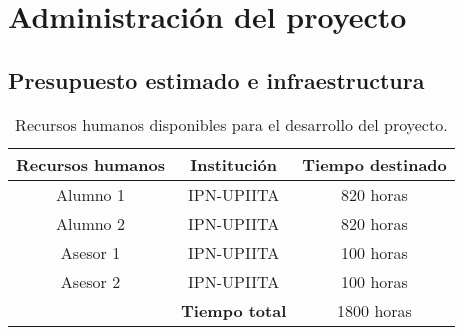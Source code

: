 \newpage
\section{Administración del proyecto}
\label{Presupuesto destinado}

\subsection{Presupuesto estimado e infraestructura}

\begin{table}[!ht]
	\centering
	\caption{Recursos humanos disponibles para el desarrollo del proyecto.}
	\begin{tabular}{ccc}
		\toprule
		\textbf{Recursos humanos} & \textbf{Institución}  & \textbf{Tiempo destinado} \\ \midrule
		        Alumno 1          &      IPN-UPIITA       &         820 horas         \\
		        Alumno 2          &      IPN-UPIITA       &         820 horas         \\ \midrule
		        Asesor 1          &      IPN-UPIITA       &         100 horas         \\
		        Asesor 2          &      IPN-UPIITA       &         100 horas         \\ \midrule
		                          & \textbf{Tiempo total} &        1800 horas         \\ \bottomrule
	\end{tabular}
\end{table}

